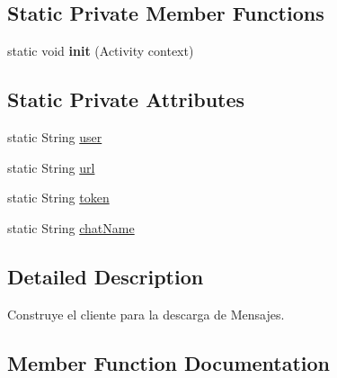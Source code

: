 \subsection*{Static Private Member Functions}
\begin{DoxyCompactItemize}
\item 
static void {\bfseries init} (Activity context)\hypertarget{classcom_1_1example_1_1sebastian_1_1tindertp_1_1chatTools_1_1ClientBuilder_aa96d6a3c713b976ed9631c355ac45d2e}{}\label{classcom_1_1example_1_1sebastian_1_1tindertp_1_1chatTools_1_1ClientBuilder_aa96d6a3c713b976ed9631c355ac45d2e}

\end{DoxyCompactItemize}
\subsection*{Static Private Attributes}
\begin{DoxyCompactItemize}
\item 
static String \hyperlink{classcom_1_1example_1_1sebastian_1_1tindertp_1_1chatTools_1_1ClientBuilder_a5689629482292f87ffd3c7786568f7d6}{user}
\item 
static String \hyperlink{classcom_1_1example_1_1sebastian_1_1tindertp_1_1chatTools_1_1ClientBuilder_a7c433c4fc6c3c4d3e3f451e26e00f5c6}{url}
\item 
static String \hyperlink{classcom_1_1example_1_1sebastian_1_1tindertp_1_1chatTools_1_1ClientBuilder_a4b37d07fc558a8cda6b6ce6a865ea8e6}{token}
\item 
static String \hyperlink{classcom_1_1example_1_1sebastian_1_1tindertp_1_1chatTools_1_1ClientBuilder_a930f0da55439617c4c79ae9b7a154548}{chat\+Name}
\end{DoxyCompactItemize}


\subsection{Detailed Description}
Construye el cliente para la descarga de Mensajes. 

\subsection{Member Function Documentation}
